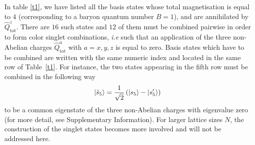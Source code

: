 \documentclass[twocolumn,aps,showpacs,prb,superscriptaddress,floatfix,10pt,nofootinbib]{revtex4-2}
\begin{document}
In table \ref{t1}, we have listed all the basis states whose total magnetisation is equal to $4$ (corresponding to a baryon quantum number $B=1$), and are annihilated by $\hat{Q}_{\mathrm{tot}}^{z}$. There are $16$ such states and $12$ of them must be combined pairwise in order to form color singlet combinations, \textit{i.e} such that an application of the three non-Abelian charges $\hat{Q}_{\mathrm{tot}}^{a}$ with $a=x,y,z$ is equal to zero. Basis states which have to be combined are written with the same numeric index and located in the same row of Table~\ref{t1}. For instance, the two states appearing in the fifth row must be combined in the following way 
\begin{equation}
\ket{\tilde{s}_{5}}=\frac{1}{\sqrt{2}}\left( \ket{s_{5}}-\ket{s_{5}^{\prime}}\right)
\label{color_singlet_example}
\end{equation}
to be a common eigenstate of the three non-Abelian charges with eigenvalue zero (for more detail, see Supplementary Information).
For larger lattice sizes $N$, the construction of the singlet states becomes more involved and will not be addressed here.
\end{document}
